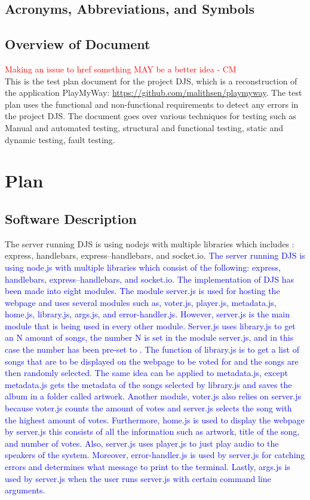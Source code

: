 \documentclass[12pt, titlepage]{article}
\begin{document}
\subsection{Acronyms, Abbreviations, and Symbols}

\subsection{Overview of Document}
\textcolor{red}{Making an issue to href something MAY be a better idea - CM} \\
This is the test plan document for the project DJS, which is a reconstruction of the application PlayMyWay: \url{https://github.com/malithsen/playmyway}.
The test plan uses the functional and non-functional requirements to detect any errors in the project DJS.
The document goes over various techniques for testing such as Manual and automated testing, structural and
functional testing, static and dynamic testing, fault testing.

\section{Plan}

\subsection{Software Description}
The server running DJS is using nodejs with multiple libraries which includes : express,
handlebars, express--handlebars, and socket.io.
\textcolor{blue}{The server running DJS is using node.js with multiple libraries which
consist of the following: express, handlebars, express--handlebars, and socket.io.
The implementation of DJS has been made into eight modules. The module server.js is used
for hosting the webpage and uses several modules such as, voter.js, player.js, metadata.js,
home.js, library.js, args.js, and error-handler.js. However, server.js is the main module
that is being used in every other module. Server.js uses library.js to get an N amount of
songs, the number N is set in the module server.js, and in this case the number has been
pre-set to \numberOfSongs. The function of library.js is to get a list of songs that are to be displayed
on the webpage to be voted for and the songs are then randomly selected. The same idea can
be applied to metadata.js, except metadata.js gets the metadata of the songs selected by
library.js and saves the album in a folder called artwork. Another module, voter.js also
relies on server.js because voter.js counts the amount of votes and server.js selects the
song with the highest amount of votes. Furthermore, home.js is used to display the webpage
by server.js this consists of all the information such as artwork, title of the song, and
number of votes. Also, server.js uses player.js to just play audio to the speakers of the
system. Moreover, error-handler.js is used by server.js for catching errors and determines
what message to print to the terminal. Lastly, args.js is used by server.js when the user
runs server.js with certain command line arguments.
}
\end{document}
